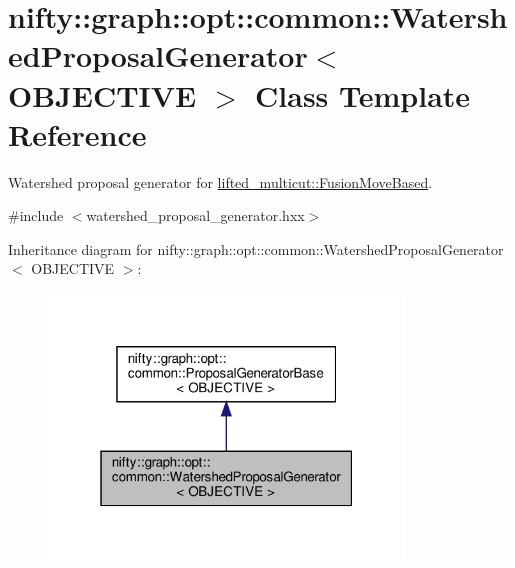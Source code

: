\hypertarget{classnifty_1_1graph_1_1opt_1_1common_1_1WatershedProposalGenerator}{}\section{nifty\+:\+:graph\+:\+:opt\+:\+:common\+:\+:Watershed\+Proposal\+Generator$<$ O\+B\+J\+E\+C\+T\+I\+VE $>$ Class Template Reference}
\label{classnifty_1_1graph_1_1opt_1_1common_1_1WatershedProposalGenerator}


Watershed proposal generator for \hyperlink{classnifty_1_1graph_1_1opt_1_1lifted__multicut_1_1FusionMoveBased}{lifted\+\_\+multicut\+::\+Fusion\+Move\+Based}.  




{\ttfamily \#include $<$watershed\+\_\+proposal\+\_\+generator.\+hxx$>$}



Inheritance diagram for nifty\+:\+:graph\+:\+:opt\+:\+:common\+:\+:Watershed\+Proposal\+Generator$<$ O\+B\+J\+E\+C\+T\+I\+VE $>$\+:
\nopagebreak
\begin{figure}[H]
\begin{center}
\leavevmode
\includegraphics[width=268pt]{classnifty_1_1graph_1_1opt_1_1common_1_1WatershedProposalGenerator__inherit__graph}
\end{center}
\end{figure}


